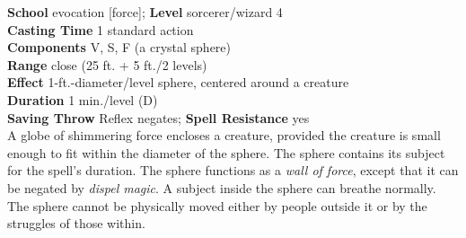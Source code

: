 \textbf{School} evocation [force]; \textbf{Level} sorcerer/wizard 4\\
\textbf{Casting Time} 1 standard action\\
\textbf{Components} V, S, F (a crystal sphere)\\
\textbf{Range} close (25 ft. + 5 ft./2 levels)\\
\textbf{Effect} 1-ft.-diameter/level sphere, centered around a creature\\
\textbf{Duration} 1 min./level (D)\\
\textbf{Saving Throw} Reflex negates; \textbf{Spell Resistance} yes\\
A globe of shimmering force encloses a creature, provided the creature is small enough to fit within the diameter of the sphere. The sphere contains its subject for the spell's duration. The sphere functions as a \textit{wall of force}, except that it can be negated by \textit{dispel magic}. A subject inside the sphere can breathe normally. The sphere cannot be physically moved either by people outside it or by the struggles of those within.\\
